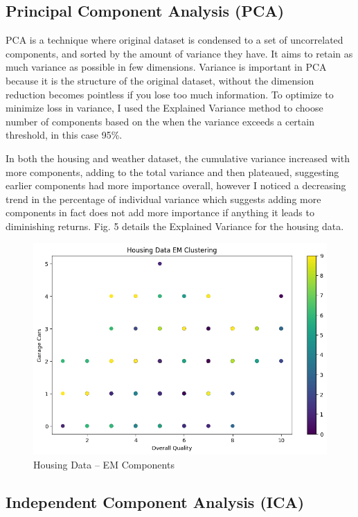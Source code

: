 \documentclass[conference]{IEEEtran}
\begin{document}
\subsection{Principal Component Analysis (PCA)}
\par PCA is a technique where original dataset is condensed to a set of uncorrelated components, and sorted by the amount of variance they have. It aims to retain as much variance as possible in few dimensions. Variance is important in PCA because it is the structure of the original dataset, without the dimension reduction becomes pointless if you lose too much information. To optimize to minimize loss in variance, I used the Explained Variance method to choose number of components based on the when the variance exceeds a certain threshold, in this case 95\%.
\par In both the housing and weather dataset, the cumulative variance increased with more components, adding to the total variance and then plateaued, suggesting earlier components had more importance overall, however I noticed a decreasing trend in the percentage of individual variance which suggests adding more components in fact does not add more importance if anything it leads to diminishing returns. Fig. 5 details the Explained Variance for the housing data.
\begin{figure}
    \centering
    \includegraphics[width=1.0\linewidth]{figures//housing_figures/step_1d.png}
    \caption{Housing Data -- EM Components}
    \label{fig:4_housing_EM
}
\end{figure}
\subsection{Independent Component Analysis (ICA)}
\end{document}
